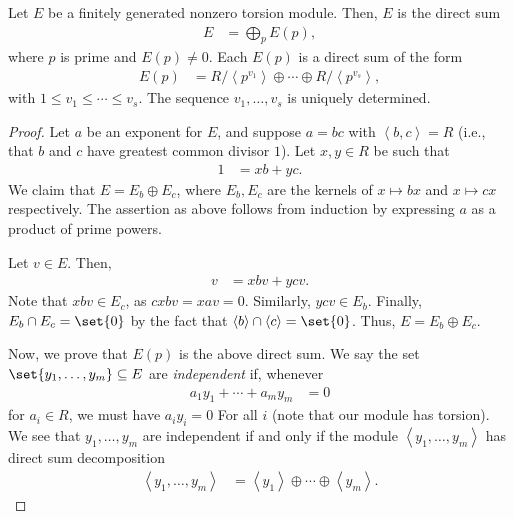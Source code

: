 \documentclass[10pt]{mypackage}
\begin{document}
\begin{theorem}
  Let $E$ be a finitely generated nonzero torsion module. Then, $E$ is the direct sum
  \begin{align*}
    E &= \bigoplus_{p} E(p),
  \end{align*}
  where $p$ is prime and $E(p)\neq 0$. Each $E(p)$ is a direct sum of the form
  \begin{align*}
    E(p) &= R/\left\langle p^{v_1} \right\rangle\oplus\cdots\oplus R/\left\langle p^{v_s} \right\rangle,
  \end{align*}
  with $1\leq v_1 \leq \cdots \leq v_s$. The sequence $v_1,\dots,v_s$ is uniquely determined.
\end{theorem}
\begin{proof}
  Let $a$ be an exponent for $E$, and suppose $a = bc$ with $\left\langle b,c \right\rangle = R$ (i.e., that $b$ and $c$ have greatest common divisor $1$). Let $x,y\in R$ be such that
  \begin{align*}
    1 &= xb + yc.
  \end{align*}
  We claim that $E = E_b \oplus E_c$, where $E_b,E_c$ are the kernels of $x\mapsto bx$ and $x \mapsto cx$ respectively. The assertion as above follows from induction by expressing $a$ as a product of prime powers.\newline

  Let $v\in E$. Then,
  \begin{align*}
    v &= xbv + ycv.
  \end{align*}
  Note that $xbv\in E_{c}$, as $cxbv = xav = 0$. Similarly, $ycv\in E_{b}$. Finally, $E_b\cap E_c = \set{0}$ by the fact that $\left\langle b \right\rangle\cap \left\langle c \right\rangle = \set{0}$. Thus, $E = E_b\oplus E_c$.\newline

  Now, we prove that $E(p)$ is the above direct sum. We say the set $\set{y_1,\dots,y_m}\subseteq E$ are \textit{independent} if, whenever
  \begin{align*}
    a_1y_1 + \cdots + a_my_m &= 0
  \end{align*}
  for $a_i\in R$, we must have $a_iy_i = 0$ For all $i$ (note that our module has torsion). We see that $y_1,\dots,y_m$ are independent if and only if the module $\left\langle y_1,\dots,y_m \right\rangle$ has direct sum decomposition
  \begin{align*}
    \left\langle y_1,\dots,y_m \right\rangle &= \left\langle y_1 \right\rangle \oplus\cdots \oplus \left\langle y_m \right\rangle.
  \end{align*}
  
\end{proof}
\end{document}
